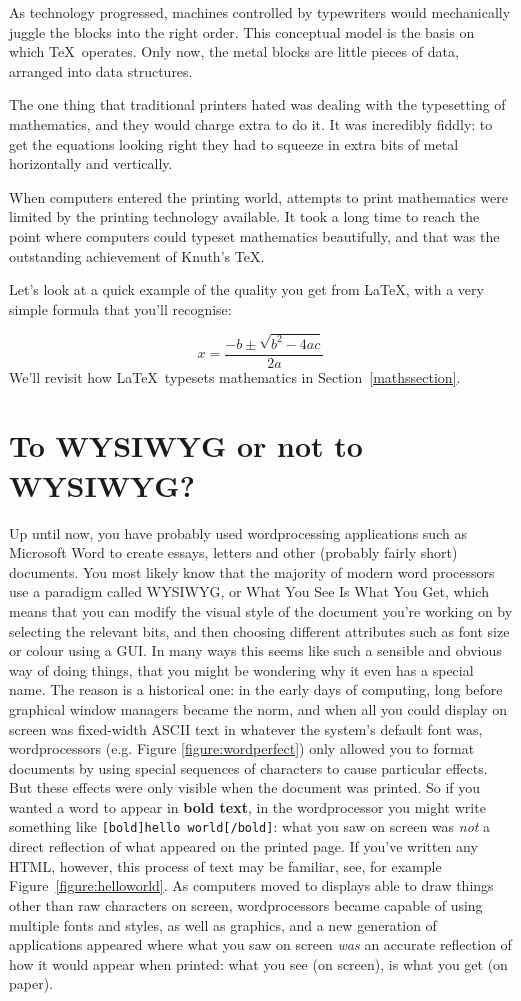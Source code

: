 \begin{refsection}
As technology progressed, machines controlled by typewriters would mechanically juggle the blocks into the right order. This conceptual model is the basis on which \TeX\ operates. Only now, the metal blocks are little pieces of data, arranged into data structures. 

The one thing that traditional printers hated was dealing with the typesetting of mathematics, and they would charge extra to do it. It was incredibly fiddly: to get the equations looking right they had to squeeze in extra bits of metal horizontally and vertically. 

When computers entered the printing world, attempts to print mathematics were limited by the printing technology available. It took a long time to reach the point where computers could typeset mathematics beautifully, and that was the outstanding achievement of Knuth's \TeX.

Let's look at a quick example of the quality you get from \LaTeX, with a very simple formula that you'll recognise:

\[ x = \frac{-b \pm \sqrt{b^2-4ac}}{2a} \]
%
We'll revisit how \LaTeX\ typesets mathematics in Section~\ref{mathssection}.

\section{To WYSIWYG or not to WYSIWYG?}
Up until now, you have probably used wordprocessing applications such as Microsoft Word to create essays, letters and other (probably fairly short) documents. You most likely know that the majority of modern word processors use a paradigm called WYSIWYG, or What You See Is What You Get, which means that you can modify the visual style of the document you're working on by selecting the relevant bits, and then choosing different attributes such as font size or colour using a GUI. In many ways this seems like such a sensible and obvious way of doing things, that you might be wondering why it even has a special name. The reason is a historical one: in the early days of computing, long before graphical window managers became the norm, and when all you could display on screen was fixed-width ASCII text in whatever the system's default font was, wordprocessors (e.g. Figure \ref{figure:wordperfect}) only allowed you to format documents by using special sequences of characters to cause particular effects. But these effects were only visible when the document was printed. So if you wanted a word to appear in \textbf{bold text}, in the wordprocessor you might write something like \texttt{[bold]hello world[/bold]}: what you saw on screen was \emph{not} a direct reflection of what appeared on the printed page. If you've written any HTML, however, this process of  text may be familiar, see, for example Figure~\ref{figure:helloworld}. As computers moved to displays able to draw things other than raw characters on screen, wordprocessors became capable of using multiple fonts and styles, as well as graphics, and a new generation of applications appeared where what you saw on screen \emph{was} an accurate reflection of how it would appear when printed: what you see (on screen), is what you get (on paper). 


\end{refsection}
